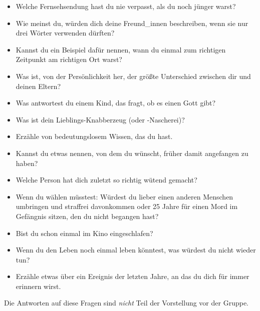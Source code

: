 \begin{itemize}
  \item Welche Fernsehsendung hast du nie verpasst, als du noch jünger warst?
  \item Wie meinst du, würden dich deine Freund\_innen beschreiben, wenn sie nur drei Wörter verwenden dürften?
  \item Kannst du ein Beispiel dafür nennen, wann du einmal zum richtigen Zeitpunkt am richtigen Ort warst?
  \item Was ist, von der Persönlichkeit her, der größte Unterschied zwischen dir und deinen Eltern?
  \item Was antwortest du einem Kind, das fragt, ob es einen Gott gibt?
  \item Was ist dein Lieblings-Knabberzeug (oder -Nascherei)?
  \item Erzähle von bedeutungslosem Wissen, das du hast.
  \item Kannst du etwas nennen, von dem du wünscht, früher damit angefangen zu haben?
  \item Welche Person hat dich zuletzt so richtig wütend gemacht?
  \item Wenn du wählen müsstest: Würdest du lieber einen anderen Menschen umbringen und straffrei davonkommen oder 25 Jahre für einen Mord im Gefängnis sitzen, den du nicht begangen hast?
  \item Bist du schon einmal im Kino eingeschlafen?
  \item Wenn du den Leben noch einmal leben könntest, was würdest du nicht wieder tun?
  \item Erzähle etwas über ein Ereignis der letzten Jahre, an das du dich für immer erinnern wirst.
\end{itemize}

Die Antworten auf diese Fragen sind \emph{nicht} Teil der Vorstellung vor der Gruppe.
